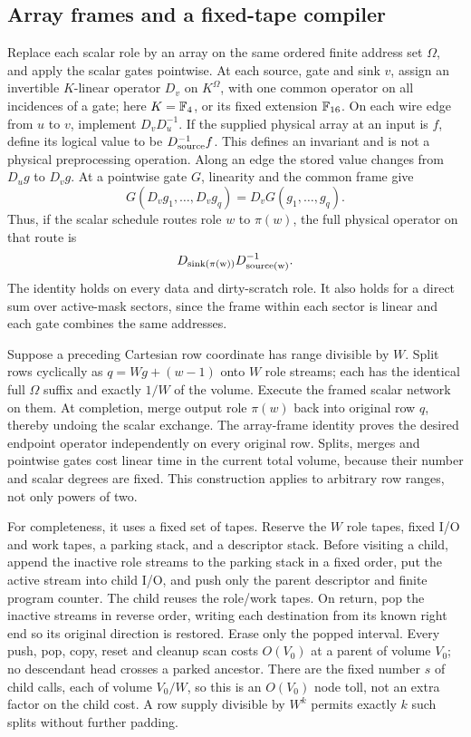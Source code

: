 \subsection{Array frames and a fixed-tape compiler}\label{app:role-compiler}

Replace each scalar role by an array on the same ordered finite address set $\Omega$, and apply the scalar gates pointwise. At each source, gate and sink $v$, assign an invertible $K$-linear operator $D_v$ on $K^\Omega$, with one common operator on all incidences of a gate; here $K=\mathbb F_4$, or its fixed extension $\mathbb F_{16}$. On each wire edge from $u$ to $v$, implement $D_vD_u^{-1}$. If the supplied physical array at an input is $f$, define its logical value to be $D_{\rm source}^{-1}f$. This defines an invariant and is not a physical preprocessing operation. Along an edge the stored value changes from $D_u g$ to $D_v g$. At a pointwise gate $G$, linearity and the common frame give
\[
 G(D_vg_1,\ldots,D_vg_q)=D_vG(g_1,\ldots,g_q).
\]
Thus, if the scalar schedule routes role $w$ to $\pi(w)$, the full physical operator on that route is
\[
 D_{\rm sink(\pi(w))}D_{\rm source(w)}^{-1}.
\]
The identity holds on every data and dirty-scratch role. It also holds for a direct sum over active-mask sectors, since the frame within each sector is linear and each gate combines the same addresses.

Suppose a preceding Cartesian row coordinate has range divisible by $W$. Split rows cyclically as $q=Wg+(w-1)$ onto $W$ role streams; each has the identical full $\Omega$ suffix and exactly $1/W$ of the volume. Execute the framed scalar network on them. At completion, merge output role $\pi(w)$ back into original row $q$, thereby undoing the scalar exchange. The array-frame identity proves the desired endpoint operator independently on every original row. Splits, merges and pointwise gates cost linear time in the current total volume, because their number and scalar degrees are fixed. This construction applies to arbitrary row ranges, not only powers of two.

For completeness, it uses a fixed set of tapes. Reserve the $W$ role tapes, fixed I/O and work tapes, a parking stack, and a descriptor stack. Before visiting a child, append the inactive role streams to the parking stack in a fixed order, put the active stream into child I/O, and push only the parent descriptor and finite program counter. The child reuses the role/work tapes. On return, pop the inactive streams in reverse order, writing each destination from its known right end so its original direction is restored. Erase only the popped interval. Every push, pop, copy, reset and cleanup scan costs $O(V_0)$ at a parent of volume $V_0$; no descendant head crosses a parked ancestor. There are the fixed number $s$ of child calls, each of volume $V_0/W$, so this is an $O(V_0)$ node toll, not an extra factor on the child cost. A row supply divisible by $W^k$ permits exactly $k$ such splits without further padding.

